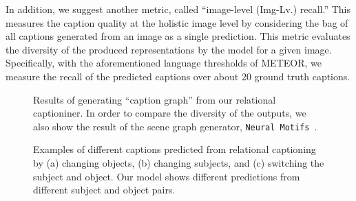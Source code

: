 In addition, we suggest another metric, called ``image-level (Img-Lv.) recall.'' 
This measures the caption quality at the holistic image level by considering the bag of all captions generated from an image as a single prediction.
This metric evaluates the diversity of the produced representations by the model for a given image.
Specifically, with the aforementioned language thresholds of METEOR, we measure the recall of the predicted captions over about 20 ground truth captions.







\begin{figure*}[t]
\vspace{-2mm}
\centering
{}
	\vspace{-4mm}
	\caption{ Results of generating ``caption graph'' from our relational captioniner. In order to compare the diversity of the outputs, we also show the result of the scene graph generator, \texttt{Neural Motifs}~\cite{zellers2018neural}.\vspace{-2mm}} 
	\label{fig:scene-graph}
\end{figure*}




\begin{figure}[b]
\vspace{-4mm}
\centering
  \vspace{-4mm}
   \caption{Examples of different captions predicted from relational captioning by (a) changing objects, (b) changing subjects, and (c) switching the subject and object. Our model shows different predictions from different subject and object pairs.\vspace{-0mm}}
\label{fig:multibox}
\end{figure}


